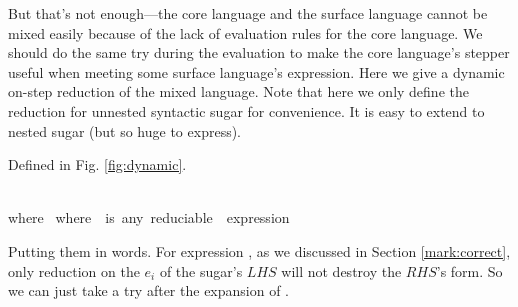 But that's not enough---the core language and the surface language cannot be mixed easily because of the lack of evaluation rules for the core language. We should do the same try during the evaluation to make the core language's stepper useful when meeting some surface language's expression. Here we give a dynamic on-step reduction of the mixed language. Note that here we only define the reduction for unnested syntactic sugar for convenience. It is easy to extend to nested sugar (but so huge to express). 

\begin{Def} Defined in Fig.  \ref{fig:dynamic}.
\end{Def}
\begin{figure*}[t]\footnotesize
{}
{}
{\\where~}
{}
{}
{}
\footnotesize{where~~is~any~reduciable~~expression}
\caption{Dynamic Reduction}
\label{fig:dynamic}
\end{figure*}

Putting them in words. For expression , as we discussed in Section \ref{mark:correct}, only reduction on the $e_i$ of the sugar's $LHS$ will not destroy the $RHS$'s form. So we can just take a try after the expansion of . 

